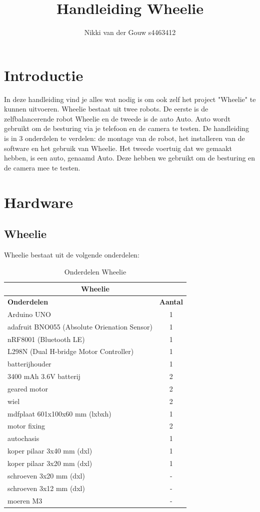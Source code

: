 \documentclass[12pt,a4paper]{article}
\author{Nikki van der Gouw s4463412}
\title{Handleiding Wheelie}
\begin{document}
\maketitle
\newpage
\tableofcontents
\newpage

\section{Introductie}
In deze handleiding vind je alles wat nodig is om ook zelf het project "Wheelie" te kunnen uitvoeren. Wheelie bestaat uit twee robots. De eerste is de zelfbalancerende robot Wheelie en de tweede is de auto Auto. Auto wordt gebruikt om de besturing via je telefoon en de camera te testen. De handleiding is in 3 onderdelen te verdelen: de montage van de robot, het installeren van de software en het gebruik van Wheelie. Het tweede voertuig dat we gemaakt hebben, is een auto, genaamd Auto. Deze hebben we gebruikt om de besturing en de camera mee te testen. 

\section{Hardware}
\subsection{Wheelie}
Wheelie bestaat uit de volgende onderdelen:

\begin{table}[!h]	
	\begin{tabular}{|l|c|}
		\hline \multicolumn{2}{|c|}{\textbf{Wheelie}}	\\	
		\hline \textbf{Onderdelen} & \textbf{Aantal} \\ 
		\hline Arduino UNO & 1 \\ 
		\hline adafruit BNO055 (Absolute Orienation Sensor) & 1 \\ 
		\hline  nRF8001 (Bluetooth LE) & 1  \\ 
		\hline L298N (Dual H-bridge Motor Controller) & 1 \\
		\hline  batterijhouder & 1  \\ 
		\hline 3400 mAh 3.6V batterij & 2 \\ 
		\hline  geared motor & 2 \\
		\hline  wiel	 & 2 \\
		\hline 	mdfplaat 601x100x60 mm (lxbxh) & 1 \\
		\hline  motor fixing & 2 \\
		\hline  autochasis & 1 \\
		\hline	koper pilaar 3x40 mm (dxl) & 1 \\
		\hline 	koper pilaar 3x20 mm (dxl) & 1 \\
		\hline 	schroeven 3x20 mm (dxl) & - \\
		\hline 	schroeven 3x12 mm (dxl) & - \\
		\hline  moeren M3 & - \\
		\hline	
	\end{tabular} 
\caption{Onderdelen Wheelie}
\label{tbl:Onderdelen_wheelie}
\end{table}
\end{document}
